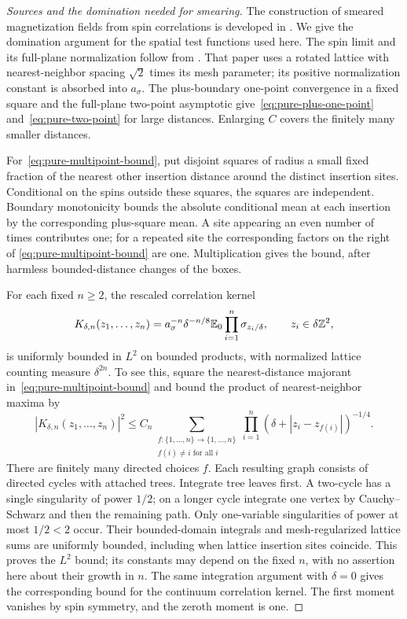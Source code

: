 \begin{proof}[Sources and the domination needed for smearing]
The construction of smeared magnetization fields from spin correlations
is developed in \cite[Section~3]{CGN2015}.  We give the domination
argument for the spatial test functions used here.
The spin limit and its full-plane normalization follow from
\cite[Theorems~1.1--1.2, Remark~1.4, and Equation~(1.6)]{CHI2015}.
That paper uses a rotated lattice with
nearest-neighbor spacing \(\sqrt2\) times its mesh parameter; its
positive normalization constant is absorbed into \(a_\sigma\).
The plus-boundary one-point convergence in a fixed square and the
full-plane two-point asymptotic give~\eqref{eq:pure-plus-one-point}
and~\eqref{eq:pure-two-point} for large distances. Enlarging \(C\)
covers the finitely many smaller distances.

For~\eqref{eq:pure-multipoint-bound}, put disjoint squares of radius
a small fixed fraction of the nearest other insertion distance around
the distinct insertion sites. Conditional on the spins outside these
squares, the squares are independent. Boundary monotonicity bounds the
absolute conditional mean at each insertion by the corresponding
plus-square mean. A site appearing an even number of times contributes
one; for a repeated site the corresponding factors on the right of
\eqref{eq:pure-multipoint-bound} are one. Multiplication gives the
bound, after harmless bounded-distance changes of the boxes.

For each fixed \(n\ge2\), the rescaled correlation kernel
\[
 K_{\delta,n}(z_1,\ldots,z_n)
 =a_\sigma^{-n}\delta^{-n/8}
          \mathbb E_0\prod_{i=1}^n\sigma_{z_i/\delta},
 \qquad z_i\in\delta\mathbb Z^2,
\]
is uniformly bounded in \(L^2\) on bounded products, with normalized
lattice counting measure \(\delta^{2n}\). To see this, square the
nearest-distance majorant in~\eqref{eq:pure-multipoint-bound} and
bound the product of nearest-neighbor maxima by
\[
 |K_{\delta,n}(z_1,\ldots,z_n)|^2
 \le C_n\sum_{\substack{f:\{1,\ldots,n\}\to\{1,\ldots,n\}\\
                       f(i)\ne i\text{ for all }i}}
       \prod_{i=1}^n(\delta+|z_i-z_{f(i)}|)^{-1/4}.
\]
There are finitely many directed choices \(f\). Each resulting graph
consists of directed cycles with attached trees. Integrate tree leaves
first. A two-cycle has a single singularity of power \(1/2\); on a
longer cycle integrate one vertex by Cauchy--Schwarz and then the
remaining path. Only one-variable singularities of power at most
\(1/2<2\) occur. Their bounded-domain integrals and mesh-regularized
lattice sums are uniformly bounded, including when lattice insertion
sites coincide. This proves the \(L^2\) bound; its constants may
depend on the fixed \(n\), with no assertion here about their growth
in \(n\). The same integration argument with \(\delta=0\) gives
the corresponding bound for the continuum correlation kernel. The
first moment vanishes by spin symmetry, and the zeroth moment is one.


\end{proof}
